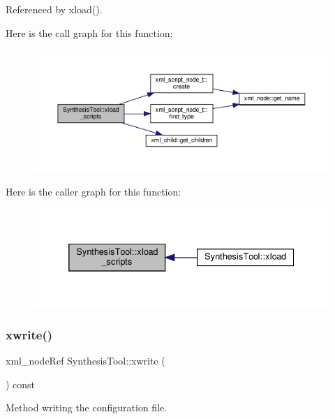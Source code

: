 Referenced by xload().

Here is the call graph for this function\+:
\nopagebreak
\begin{figure}[H]
\begin{center}
\leavevmode
\includegraphics[width=350pt]{d9/de0/classSynthesisTool_a4ab567e999004b7d1c798115f548eb46_cgraph}
\end{center}
\end{figure}
Here is the caller graph for this function\+:
\nopagebreak
\begin{figure}[H]
\begin{center}
\leavevmode
\includegraphics[width=332pt]{d9/de0/classSynthesisTool_a4ab567e999004b7d1c798115f548eb46_icgraph}
\end{center}
\end{figure}
\mbox{\label{classSynthesisTool_afd06f53f3a3273de98fe02143b123252}} 
\subsubsection{\texorpdfstring{xwrite()}{xwrite()}}
{\footnotesize\ttfamily xml\+\_\+node\+Ref Synthesis\+Tool\+::xwrite (\begin{DoxyParamCaption}{ }\end{DoxyParamCaption}) const}



Method writing the configuration file. 



